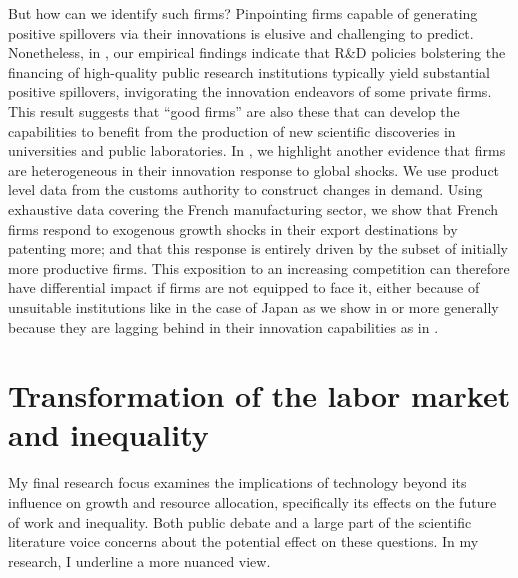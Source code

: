 \documentclass[12pt]{article}
\begin{document}
But how can we identify such firms? Pinpointing firms capable of generating positive spillovers via their innovations is elusive and challenging to predict. Nonetheless, in \citet*{bergeaud2022public}, our empirical findings indicate that R\&D policies bolstering the financing of high-quality public research institutions typically yield substantial positive spillovers, invigorating the innovation endeavors of some private firms. This result suggests that ``good firms'' are also these that can develop the capabilities to benefit from the production of new scientific discoveries in universities and public laboratories. In \citet*{aghion2022heterogeneous}, we highlight another evidence that firms are heterogeneous in their innovation response to global shocks. We use product level data from the customs authority to construct changes in demand. Using exhaustive data covering the French manufacturing sector, we show that French firms respond to exogenous growth shocks in their export destinations by patenting more; and that this response is entirely driven by the subset of initially more productive firms. This exposition to an increasing competition can therefore have differential impact if firms are not equipped to face it, either because of unsuitable institutions like in the case of Japan as we show in \citet*{respolito} or more generally because they are lagging behind in their innovation capabilities as in \citet*{aghion2021opposing}.

\section*{Transformation of the labor market and inequality}

My final research focus examines the implications of technology beyond its influence on growth and resource allocation, specifically its effects on the future of work and inequality. Both public debate and a large part of the scientific literature voice concerns about the potential effect on these questions. In my research, I underline a more nuanced view.
\end{document}
